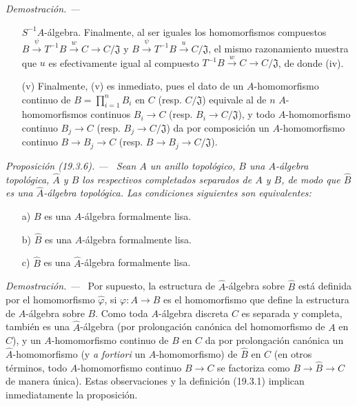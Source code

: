 \documentclass[10pt,oneside]{book}
\makeatletter
\newcommand{\setmanualcurrentlabel}[1]{\def\@currentlabel{#1}}
\newcommand{\oldpage}[2][]{%
  \setcounter{footnote}{0}%
  \marginpar{\scriptsize\textbf{#1}~|~#2}\ignorespaces}
\newenvironment{proposition}[1][]{%
  \setmanualcurrentlabel{#1}\par\medskip\noindent\itshape Proposición (#1). ---\ }{\par}
\newenvironment{proof}{%
  \par\medskip\noindent\textit{Demostración. ---\ }}{\par}
\makeatother
\begin{document}
\begin{proof}
\begin{enumerate}
  $S^{-1}A$-álgebra. Finalmente, al ser iguales los homomorfismos compuestos
  $B\xrightarrow{\psi}T^{-1}B\xrightarrow{w}C\to C/\mathfrak J$ y
  $B\xrightarrow{\psi}T^{-1}B\xrightarrow{u}C/\mathfrak J$, el mismo
  razonamiento muestra que $u$ es efectivamente igual al compuesto
  $T^{-1}B\xrightarrow{w}C\to C/\mathfrak J$, de donde (iv).
  \item[(v)] Finalmente, (v) es inmediato, pues el dato de un $A$-homomorfismo
  continuo de $B=\prod_{i=1}^n B_i$ en $C$ (resp. $C/\mathfrak J$)
  equivale al de $n$ $A$-homomorfismos continuos $B_i\to C$
  (resp. $B_i\to C/\mathfrak J$), y todo $A$-homomorfismo continuo
  $B_j\to C$ (resp. $B_j\to C/\mathfrak J$) da por composición un
  $A$-homomorfismo continuo $B\to B_j\to C$
  (resp. $B\to B_j\to C/\mathfrak J$).
\end{enumerate}
\end{proof}

\oldpage[0\textsubscript{IV-1}]{83}

\begin{proposition}[19.3.6]
\label{0.19.3.6-es}
Sean $A$ un anillo topológico, $B$ una $A$-álgebra topológica, $\hat A$
y $\hat B$ los respectivos completados separados de $A$ y $B$, de modo que
$\hat B$ es una $\hat A$-álgebra topológica. Las condiciones siguientes
son equivalentes:
\begin{enumerate}
  \item[\textup{a)}] $B$ es una $A$-álgebra formalmente lisa.
  \item[\textup{b)}] $\hat B$ es una $A$-álgebra formalmente lisa.
  \item[\textup{c)}] $\hat B$ es una $\hat A$-álgebra formalmente lisa.
\end{enumerate}
\end{proposition}

\begin{proof}
Por supuesto, la estructura de $\hat A$-álgebra sobre $\hat B$ está definida
por el homomorfismo $\hat\varphi$, si $\varphi:A\to B$ es
el homomorfismo que define la estructura de $A$-álgebra sobre $B$. Como toda
$A$-álgebra discreta $C$ es separada y completa, también es una
$\hat A$-álgebra (por prolongación canónica del homomorfismo de $A$ en
$C$), y un $A$-homomorfismo continuo de $B$ en $C$ da por prolongación
canónica un $\hat A$-homomorfismo (y \emph{a fortiori} un
$A$-homomorfismo) de $\hat B$ en $C$ (en otros términos, todo
$A$-homomorfismo continuo $B\to C$ se factoriza como $B\to\hat B\to C$ de manera
única). Estas observaciones y la definición (19.3.1) implican inmediatamente la
proposición.
\end{proof}
\end{document}
